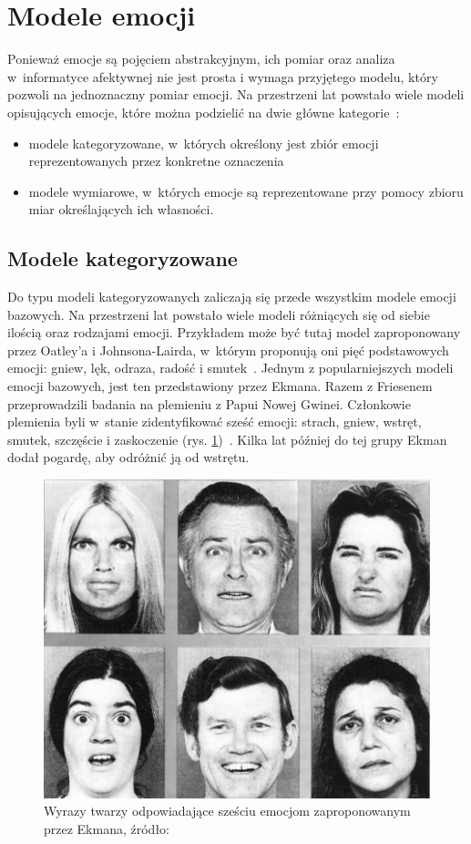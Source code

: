 \section{Modele emocji}
Ponieważ emocje są pojęciem abstrakcyjnym, ich pomiar oraz analiza w~informatyce afektywnej nie jest prosta i wymaga przyjętego modelu, który pozwoli na jednoznaczny pomiar emocji. Na przestrzeni lat powstało wiele modeli opisujących emocje, które można podzielić na dwie główne kategorie~\cite{emotion_models_review_2017}:
\begin{itemize}
	\item modele kategoryzowane, w~których określony jest zbiór emocji reprezentowanych przez konkretne oznaczenia
	\item modele wymiarowe, w~których emocje są reprezentowane przy pomocy zbioru miar określających ich własności.
\end{itemize}

\subsection{Modele kategoryzowane}
Do typu modeli kategoryzowanych zaliczają się przede wszystkim modele emocji bazowych. Na przestrzeni lat powstało wiele modeli różniących się od siebie ilością oraz rodzajami emocji. Przykładem może być tutaj model zaproponowany przez Oatley'a i Johnsona-Lairda, w~którym proponują oni pięć podstawowych emocji: gniew, lęk, odraza, radość i smutek~\cite{oatley_theory_of_emotions}. Jednym z popularniejszych modeli emocji bazowych, jest ten przedstawiony przez Ekmana. Razem z Friesenem przeprowadzili badania na plemieniu z Papui Nowej Gwinei. Członkowie plemienia byli w~stanie zidentyfikować sześć emocji: strach, gniew, wstręt, smutek, szczęście i zaskoczenie (rys. \ref{fig:ekman_six_emotions})~\cite{Ekman1971ConstantsAC}. Kilka lat później do tej grupy Ekman dodał pogardę, aby odróżnić ją od wstrętu. 
\begin{figure}[h]
	\centering
	\includegraphics[width=0.6\linewidth]{images/ekman_six_basic_emotions.png}
	\caption{Wyrazy twarzy odpowiadające sześciu emocjom zaproponowanym przez Ekmana, źródło: \cite{Ekman1971ConstantsAC}}
	\label{fig:ekman_six_emotions}
\end{figure}

